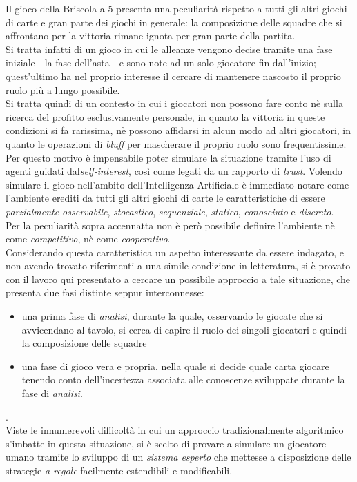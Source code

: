 \documentclass[runningheads,a4paper]{llncs}
\begin{document}
Il gioco della Briscola a 5 presenta una peculiarità rispetto a tutti gli altri giochi di carte e gran parte dei giochi in generale: la composizione delle squadre che si affrontano per la vittoria rimane ignota per gran parte della partita. \\
Si tratta infatti di un gioco in cui le alleanze vengono decise tramite una fase iniziale - la fase dell'asta - e sono note ad un solo giocatore fin dall'inizio; quest'ultimo ha nel proprio interesse il cercare di mantenere nascosto il proprio ruolo più a lungo possibile. \\
Si tratta quindi di un contesto in cui i giocatori non possono fare conto nè sulla ricerca del profitto esclusivamente personale, in quanto la vittoria in queste condizioni si fa rarissima, nè possono affidarsi in alcun modo ad altri giocatori, in quanto le operazioni di \emph{bluff} per mascherare il proprio ruolo sono frequentissime. \\
Per questo motivo è impensabile poter simulare la situazione tramite l'uso di agenti guidati dal\emph{self-interest}, così come legati da un rapporto di \emph{trust}.
Volendo simulare il gioco nell'ambito dell'Intelligenza Artificiale è immediato notare come l'ambiente erediti da tutti gli altri giochi di carte le caratteristiche di essere \emph{parzialmente osservabile}, \emph{stocastico}, \emph{sequenziale}, \emph{statico}, \emph{conosciuto} e \emph{discreto}. \\
Per la peculiarità sopra accennatta non è però possibile definire l'ambiente nè come \emph{competitivo}, nè come \emph{cooperativo}.\\
Considerando questa caratteristica un aspetto interessante da essere indagato, e non avendo trovato riferimenti a una simile condizione in letteratura, si è provato con il lavoro qui presentato a cercare un possibile approccio a tale situazione, che presenta due fasi distinte seppur interconnesse:
\begin{itemize}
  \item una prima fase di \emph{analisi}, durante la quale, osservando le giocate che si avvicendano al tavolo, si cerca di capire il ruolo dei singoli giocatori e quindi la composizione delle squadre
  \item una fase di gioco vera e propria, nella quale si decide quale carta giocare tenendo conto dell'incertezza associata alle conoscenze sviluppate durante la fase di \emph{analisi}.
\end{itemize}.\\
Viste le innumerevoli difficoltà in cui un approccio tradizionalmente algoritmico s'imbatte in questa situazione, si è scelto di provare a simulare un giocatore umano tramite lo sviluppo di un \emph{sistema esperto} che mettesse a disposizione delle strategie \emph{a regole} facilmente estendibili e modificabili.
\end{document}
